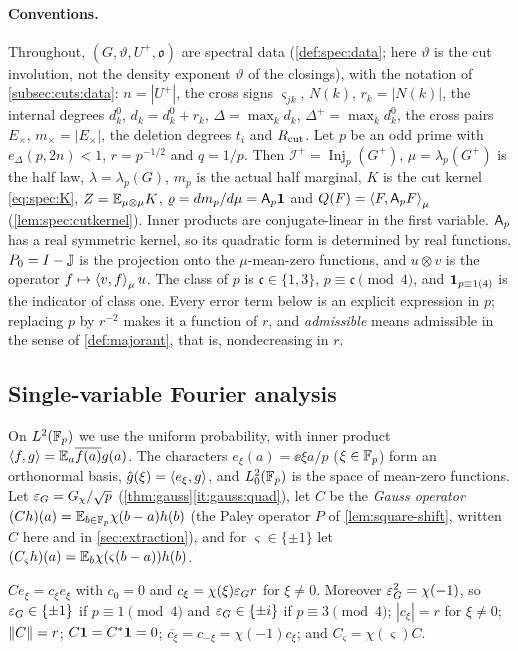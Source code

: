 \paragraph{Conventions.}
Throughout, $(G,\vartheta,U^+,\mathfrak o)$ are spectral data
(\cref{def:spec:data}; here $\vartheta$ is the cut involution, not the density exponent $\vartheta$ of the closings), with the notation of \cref{subsec:cuts:data}:
$n=|U^+|$, the cross signs $\varsigma_{jk}$, $N(k)$, $r_k=|N(k)|$, the internal
degrees $d^0_k$, $d_k=d^0_k+r_k$, $\Delta=\max_kd_k$, $\Delta^+=\max_kd^0_k$, the
cross pairs $E_\times$, $m_\times=|E_\times|$, the deletion degrees $t_i$ and
$R_{\mathrm{cut}}$. Let $p$ be an odd prime with $e_\Delta(p,2n)<1$, $r=p^{-1/2}$ and
$q=1/p$. Then $\mathcal I^+=\operatorname{Inj}_p(G^+)$, $\mu=\lambda_p(G^+)$ is the
half law, $\lambda=\lambda_p(G)$, $m_p$ is the actual half marginal, $K$ is the
cut kernel \eqref{eq:spec:K}, $Z=\mathbb E_{\mu\otimes\mu}K$, $\varrho=dm_p/d\mu=\mathsf A_p\mathbf 1$
and $Q(F)=\left\langle F,\mathsf A_p F\right\rangle_\mu$ (\cref{lem:spec:cutkernel}). Inner products are
conjugate-linear in the first variable. $\mathsf A_p$ has a real symmetric kernel, so
its quadratic form is determined by real functions. $P_0=I-\mathbb J$ is the
projection onto the $\mu$-mean-zero functions, and $u\otimes v$ is the operator
$f\mapsto\left\langle v,f\right\rangle_\mu u$. The class of $p$ is $\mathfrak c\in\{1,3\}$,
$p\equiv\mathfrak c\pmod4$, and $\mathbf 1_{p\equiv1(4)}$ is the indicator of class one.
Every error term below is an explicit expression in $p$; replacing $p$ by
$r^{-2}$ makes it a function of $r$, and \emph{admissible} means admissible in
the sense of \cref{def:majorant}, that is, nondecreasing in $r$.

\subsection{Single-variable Fourier analysis}\label{subsec:spec:fourier}

On $L^2(\mathbb F_p)$ we use the uniform probability, with inner product
$\left\langle f,g\right\rangle=\mathbb E_a\overline{f(a)}g(a)$. The characters $e_\xi(a)=\ee{\xi a/p}$ ($\xi\in\mathbb F_p$) form an orthonormal basis,
$\hat g(\xi)=\left\langle e_\xi,g\right\rangle$, and $L^2_0(\mathbb F_p)$ is the space of mean-zero functions.
Let $\varepsilon_G=G_\chi/\sqrt p$ (\cref{thm:gauss}\ref{it:gauss:quad}), let $C$ be the
\emph{Gauss operator} $(Ch)(a)=\mathbb E_{b\in\mathbb F_p}\chi(b-a)h(b)$ (the Paley operator $P$
of \cref{lem:square-shift}, written $C$ here and in \cref{sec:extraction}), and for
$\varsigma\in\{\pm1\}$ let $(C_\varsigma h)(a)=\mathbb E_b\chi(\varsigma(b-a))h(b)$.

\begin{lemma}\label{lem:spec:gauss}
$Ce_\xi=c_\xi e_\xi$ with $c_0=0$ and $c_\xi=\chi(\xi)\varepsilon_Gr$ for $\xi\ne0$.
Moreover $\varepsilon_G^2=\chi(-1)$, so $\varepsilon_G\in\{\pm1\}$ if $p\equiv1\pmod4$ and
$\varepsilon_G\in\{\pm i\}$ if $p\equiv3\pmod4$; $|c_\xi|=r$ for $\xi\ne0$; $\left\|C\right\|=r$;
$C\mathbf 1=C^*\mathbf 1=0$; $\overline{c_\xi}=c_{-\xi}=\chi(-1)c_\xi$; and
$C_\varsigma=\chi(\varsigma)C$.
\end{lemma}


